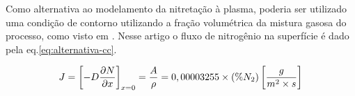 Como alternativa ao modelamento da nitretação à plasma, poderia ser utilizado uma condição de contorno utilizando a fração volumétrica da mistura gasosa do processo, como visto em \cite{garzon2006modelamento}. Nesse artigo o fluxo de nitrogênio na superfície é dado pela eq.\ref{eq:alternativa-cc}.

\begin{equation} \label{eq:alternativa-cc}
 J = \left[-D\pdv{N}{x}\right]_{x=0} = \dfrac{A}{\rho} = 0,00003255 \times (\%N_2)  \left[\frac{g}{m^2\times s}\right]
\end{equation}
